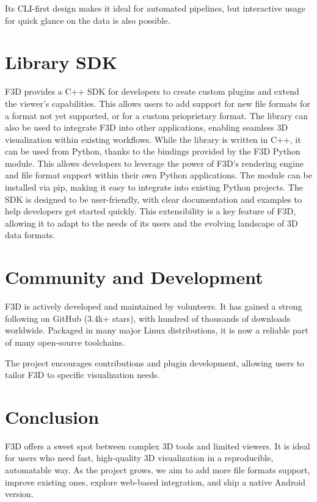 \documentclass[10pt,journal,cspaper,compsoc]{journeevisu}
\begin{document}
Its CLI-first design makes it ideal for automated pipelines, but interactive usage for quick glance on the data is also possible.

\section{Library SDK}

F3D provides a C++ SDK for developers to create custom plugins and extend the viewer's capabilities. This allows users to add support for new file formats for a format not yet supported, or for a custom prioprietary format.
The library can also be used to integrate F3D into other applications, enabling seamless 3D visualization within existing workflows.
While the library is written in C++, it can be used from Python, thanks to the bindings provided by the F3D Python module. This allows developers to leverage the power of F3D's rendering engine and file format support within their own Python applications. The module can be installed via pip, making it easy to integrate into existing Python projects.
The SDK is designed to be user-friendly, with clear documentation and examples to help developers get started quickly. This extensibility is a key feature of F3D, allowing it to adapt to the needs of its users and the evolving landscape of 3D data formats.

\section{Community and Development}

F3D is actively developed and maintained by volunteers. It has gained a strong following on GitHub (3.4k+ stars), with hundred of thousands of downloads worldwide. Packaged in many major Linux distributions, it is now a reliable part of many open-source toolchains.

The project encourages contributions and plugin development, allowing users to tailor F3D to specific visualization needs.

\section{Conclusion}

F3D offers a sweet spot between complex 3D tools and limited viewers. It is ideal for users who need fast, high-quality 3D visualization in a reproducible, automatable way. As the project grows, we aim to add more file formats support, improve existing ones, explore web-based integration, and ship a native Android version.
\end{document}
